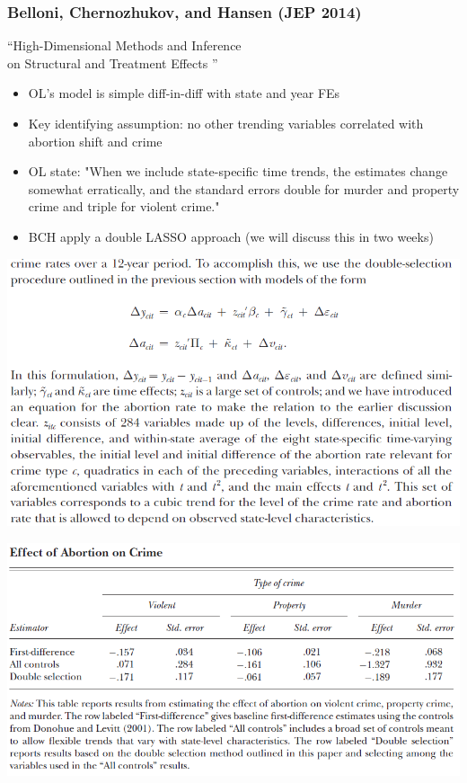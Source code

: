 \begin{frame}
    \frametitle{Belloni, Chernozhukov, and Hansen (JEP 2014)}
    \nocite{belloniJEP}
    ``High-Dimensional Methods and Inference \\ on Structural and Treatment Effects ''

\begin{itemize}
    \item OL's model is simple diff-in-diff with state and year FEs
    \item Key identifying assumption: no other trending variables correlated with abortion shift and crime
    \item OL state: "When we include state-specific time trends, the estimates change somewhat erratically, and the standard errors double for murder and property crime and triple for violent crime."
    \item BCH apply a double LASSO approach (we will discuss this in two weeks) 
\end{itemize}
\end{frame}

\begin{frame}
    \vspace{-10pt}
    \begin{center}
    \includegraphics[scale=0.5]{./resources/BCHLevittVars}
    \end{center}
\end{frame}

\begin{frame}
    \vspace{-10pt}
    \begin{center}
    \includegraphics[scale=0.5]{./resources/BCHLevittTable}
    \end{center}
\end{frame}

